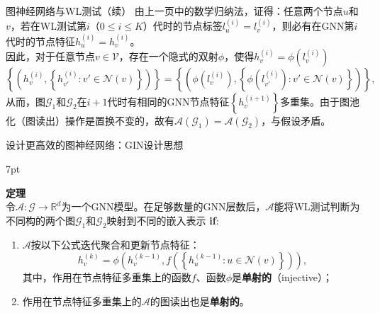 \documentclass{beamer}
\newenvironment{formal}{%
	\def\FrameCommand{%
		\hspace{1pt}%
		{\color{deepgreen}\vrule width 2pt}%
		{\color{greenshade}\vrule width 4pt}%
		\colorbox{greenshade}%
	}%
	\MakeFramed{\advance\hsize-\width\FrameRestore}%
	\noindent\hspace{-4.55pt}%
	\begin{adjustwidth}{}{7pt}%
		\vspace{2pt}\vspace{2pt}%
	}
	{%
		\vspace{2pt}
	\end{adjustwidth}\endMakeFramed%
}
\begin{document}
\begin{frame}{图神经网络与WL测试（续）}
	由上一页中的数学归纳法，证得：{\color{red}任意两个节点$u$和$v$，若在WL测试第$i$（$0\le i\le K$）代时的节点标签$l_u^{\left(i\right)}=l_v^{\left(i\right)}$，则必有在GNN第$i$代时的节点特征$h_u^{\left(i\right)}=h_v^{\left(i\right)}$}。\\
	因此，对于任意节点$v\in\mathscr{V}$，存在一个隐式的双射$\phi$，使得$h_v^{\left(i\right)}=\phi\left(l_v^{\left(i\right)}\right)$
	\begin{equation}
		\left\{\left(h_v^{\left(i\right)},\left\{h_{v'}^{\left(i\right)}:v'\in\mathcal{N}\left(v\right)\right\}\right)\right\}=\left\{\left(\phi\left(l_v^{\left(i\right)}\right),\left\{\phi\left(l_{v'}^{\left(i\right)}\right):v'\in\mathcal{N}\left(v\right)\right\}\right)\right\},
	\end{equation}
	从而，图$\mathscr{G}_1$和$\mathscr{G}_2$在$i+1$代时有相同的GNN节点特征$\left\{h_v^{\left(i+1\right)}\right\}$多重集。由于图池化（图读出）操作是置换不变的，故有$\mathcal{A}\left(\mathscr{G}_1\right)=\mathcal{A}\left(\mathscr{G}_2\right)$，{\color{red}与假设矛盾}。
\end{frame}

\begin{frame}{设计更高效的图神经网络：GIN设计思想~\cite{xu2019gin}}
	\begin{formal}
		\textbf{定理}\\
		令$\mathcal{A}:\mathscr{G}\to\mathbb{R}^d$为一个GNN模型。在足够数量的GNN层数后，$\mathcal{A}$能将WL测试判断为不同构的两个图$\mathscr{G}_1$和$\mathscr{G}_2$映射到不同的嵌入表示 {\color{red}\textbf{if}}:
		\begin{enumerate}
			\item $\mathcal{A}$按以下公式迭代聚合和更新节点特征：
			\begin{equation}
				h_v^{\left(k\right)}=\phi\left(h_v^{\left(k-1\right)},f\left(\left\{h_u^{\left(k-1\right)}:u\in\mathcal{N}\left(v\right)\right\}\right)\right),
			\end{equation}
			其中，作用在节点特征多重集上的函数$f$、函数$\phi$是{\color{red}\textbf{单射的}}（injective）；
			\item 作用在节点特征多重集上的$\mathcal{A}$的图读出也是{\color{red}\textbf{单射的}}。
		\end{enumerate}
	\end{formal}
\end{frame}
\end{document}
